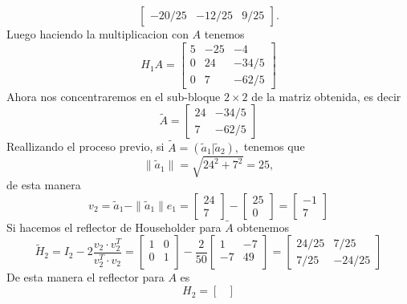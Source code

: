 \begin{enumerate}
\begin{solution}
$$\begin{bmatrix}
                -20/25&-12/25&9/25
            \end{bmatrix}.$$
            Luego haciendo la multiplicacion con $A$ tenemos
            $$H_1A=\begin{bmatrix}
                5&-25&-4\\
                0&24&-34/5\\
                0&7&-62/5
            \end{bmatrix}$$
            Ahora nos concentraremos en el sub-bloque $2\times 2$ de la matriz obtenida, es decir
            $$\tilde{A}=\begin{bmatrix}
                24&-34/5\\
                7&-62/5
            \end{bmatrix}$$
            Reallizando el proceso previo, si $\tilde{A}=(\tilde{a}_1|\tilde{a}_2),$ tenemos que
            $$\|\tilde{a}_1\|=\sqrt{24^2+7^2}=25,$$
            de esta manera
            $$v_2=\tilde{a}_1-\|\tilde{a}_1\|e_1=\begin{bmatrix}
                24\\
                7
            \end{bmatrix}-\begin{bmatrix}
                25\\
                0
            \end{bmatrix}=\begin{bmatrix}
                -1\\
                7
            \end{bmatrix}$$
            Si hacemos el reflector de Householder para $\tilde{A}$ obtenemos
            $$\tilde{H}_2=I_2-2\frac{v_2\cdot v_2^T}{v_2^T\cdot v_2}=\begin{bmatrix}
                1&0\\
                0&1\\
            \end{bmatrix}-\frac{2}{50}\begin{bmatrix}
                1 & -7\\
                -7 & 49\\
            \end{bmatrix}=\begin{bmatrix}
                24/25&7/25\\
                7/25&-24/25
            \end{bmatrix}$$
            De esta manera el reflector para $A$ es
            $$H_2=\begin{bmatrix}

\end{bmatrix}$$
\end{solution}
\end{enumerate}
